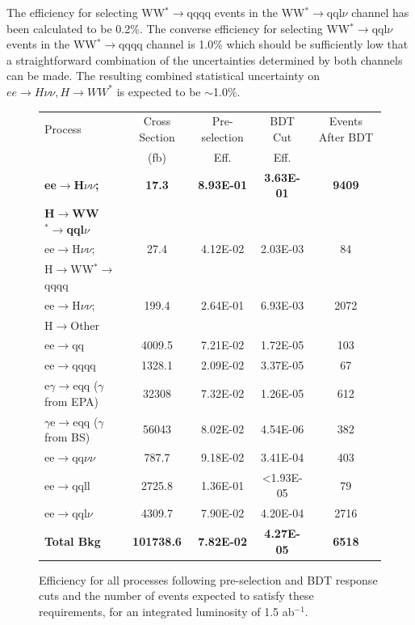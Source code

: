The efficiency for selecting WW$^*\rightarrow$qqqq events in the WW$^*\rightarrow$qql$\nu$ channel has been calculated to be 0.2\%. The converse efficiency for selecting WW$^*\rightarrow$qql$\nu$ events in the WW$^*\rightarrow$qqqq channel is 1.0\% which should be sufficiently low that a straightforward combination of the uncertainties determined by both channels can be made. The resulting combined statistical uncertainty on $ee\rightarrow H\nu\nu, H\rightarrow WW^*$ is expected to be $\sim$1.0\%.

\begin{figure}
  \centering
  \begin{tabular}{l c c c c}
   \toprule
    Process & Cross Section & Pre-selection & BDT Cut  & Events After BDT     \\
    & (fb) & Eff. & Eff. &      \\
    \midrule
    \midrule
    \bf{ee$\rightarrow$H$\nu\nu$;}            & \bf{17.3}    &  \bf{8.93E-01}  & \bf{3.63E-01} & \bf{9409}    \\
    \bf{H$\rightarrow$WW$^*\rightarrow$qql$\nu$} & & & & \\
    \midrule
    \midrule
    ee$\rightarrow$H$\nu\nu$;  & 27.4    & 4.12E-02 & 2.03E-03 & 84  \\
    H$\rightarrow$WW$^*\rightarrow$qqqq & & & & \\
    ee$\rightarrow$H$\nu\nu$; & 199.4 & 2.64E-01 & 6.93E-03 & 2072 \\
    H$\rightarrow$Other & & & & \\
    \midrule
    \midrule
    ee$\rightarrow$qq               & 4009.5    & 7.21E-02 &  1.72E-05 & 103  \\ 
    ee$\rightarrow$qqqq               & 1328.1    &  2.09E-02 & 3.37E-05 & 67   \\ 
    e$\gamma$$\rightarrow$eqq ($\gamma$ from EPA)                 & 32308    & 7.32E-02  & 1.26E-05 & 612  \\ 
    $\gamma$e$\rightarrow$eqq ($\gamma$ from BS)               &  56043   & 8.02E-02 & 4.54E-06 & 382  \\ 
    ee$\rightarrow$qq$\nu\nu$               & 787.7    & 9.18E-02 & 3.41E-04 & 403   \\ 
    ee$\rightarrow$qqll               & 2725.8    & 1.36E-01  & <1.93E-05 & 79    \\ 
    ee$\rightarrow$qql$\nu$              & 4309.7    & 7.90E-02  & 4.20E-04 & 2716    \\ 
    \midrule
    \midrule
    \bf{Total Bkg}                    & \bf{101738.6} & \bf{7.82E-02} & \bf{4.27E-05} & \bf{6518} \\
    \midrule
    \bottomrule
  \end{tabular}
  \caption[Samples Used]{Efficiency for all processes following pre-selection and BDT response cuts and the number of events expected to satisfy these requirements, for an integrated luminosity of 1.5 ab$^{-1}$.}
  \label{cuts}
\end{figure}

